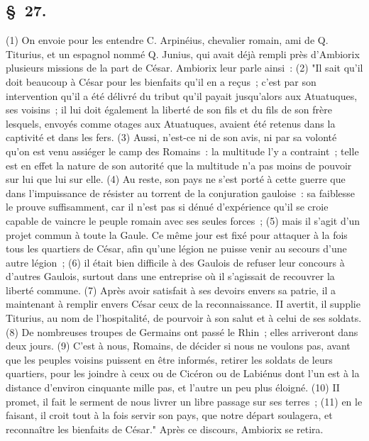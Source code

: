 \documentclass[french,twoside]{book} %
\begin{document}
\subsection[{§ 27.}]{ \textsc{§ 27.} }
\noindent (1) On envoie pour les entendre C. Arpinéius, chevalier romain, ami de Q. Titurius, et un espagnol nommé Q. Junius, qui avait déjà rempli près d’Ambiorix plusieurs missions de la part de César. Ambiorix leur parle ainsi : (2) "Il sait qu’il doit beaucoup à César pour les bienfaits qu’il en a reçus ; c’est par son intervention qu’il a été délivré du tribut qu’il payait jusqu’alors aux Atuatuques, ses voisins ; il lui doit également la liberté de son fils et du fils de son frère lesquels, envoyés comme otages aux Atuatuques, avaient été retenus dans la captivité et dans les fers. (3) Aussi, n’est-ce ni de son avis, ni par sa volonté qu’on est venu assiéger le camp des Romains : la multitude l’y a contraint ; telle est en effet la nature de son autorité que la multitude n’a pas moins de pouvoir sur lui que lui sur elle. (4) Au reste, son pays ne s’est porté à cette guerre que dans l’impuissance de résister au torrent de la conjuration gauloise : sa faiblesse le prouve suffisamment, car il n’est pas si dénué d’expérience qu’il se croie capable de vaincre le peuple romain avec ses seules forces ; (5) mais il s’agit d’un projet commun à toute la Gaule. Ce même jour est fixé pour attaquer à la fois tous les quartiers de César, afin qu’une légion ne puisse venir au secours d’une autre légion ; (6) il était bien difficile à des Gaulois de refuser leur concours à d’autres Gaulois, surtout dans une entreprise où il s’agissait de recouvrer la liberté commune. (7) Après avoir satisfait à ses devoirs envers sa patrie, il a maintenant à remplir envers César ceux de la reconnaissance. II avertit, il supplie Titurius, au nom de l’hospitalité, de pourvoir à son salut et à celui de ses soldats. (8) De nombreuses troupes de Germains ont passé le Rhin ; elles arriveront dans deux jours. (9) C'est à nous, Romains, de décider si nous ne voulons pas, avant que les peuples voisins puissent en être informés, retirer les soldats de leurs quartiers, pour les joindre à ceux ou de Cicéron ou de Labiénus dont l’un est à la distance d’environ cinquante mille pas, et l’autre un peu plus éloigné. (10) II promet, il fait le serment de nous livrer un libre passage sur ses terres ; (11) en le faisant, il croit tout à la fois servir son pays, que notre départ soulagera, et reconnaître les bienfaits de César." Après ce discours, Ambiorix se retira.
\end{document}
